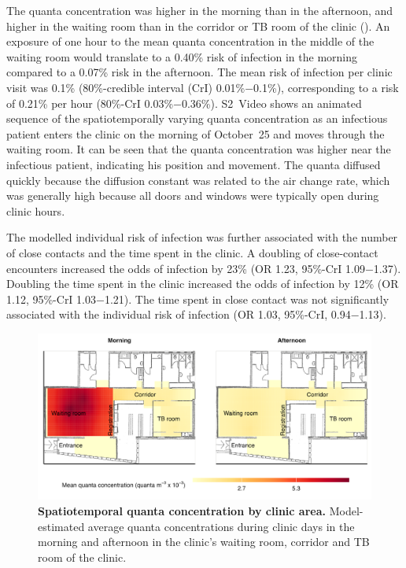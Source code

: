 \documentclass[fleqn,11pt]{wlscirep}
\begin{document}
The quanta concentration was higher in the morning than in the afternoon, and higher in the waiting room than in the corridor or TB room of the clinic (). An exposure of one hour to the mean quanta concentration in the middle of the waiting room would translate to a 0.40\% risk of infection in the morning compared to a 0.07\% risk in the afternoon. The mean risk of infection per clinic visit was 0.1\% (80\%-credible interval (CrI) 0.01\%$-$0.1\%), corresponding to a risk of 0.21\% per hour (80\%-CrI 0.03\%$-$0.36\%). S2~Video shows an animated sequence of the spatiotemporally varying quanta concentration as an infectious patient enters the clinic on the morning of October~25 and moves through the waiting room. It can be seen that the quanta concentration was higher near the infectious patient, indicating his position and movement. The quanta diffused quickly because the diffusion constant was related to the air change rate, which was generally high because all doors and windows were typically open during clinic hours.

The modelled individual risk of infection was further associated with the number of close contacts and the time spent in the clinic. A doubling of close-contact encounters increased the odds of infection by 23\% (OR 1.23, 95\%-CrI 1.09$-$1.37). Doubling the time spent in the clinic increased the odds of infection by 12\% (OR 1.12, 95\%-CrI 1.03$-$1.21). The time spent in close contact was not significantly associated with the individual risk of infection (OR 1.03, 95\%-CrI, 0.94$-$1.13). 

\begin{figure}
    \centering
    \includegraphics{results/modeling/mean-quanta-concentration.png}
    \caption{\textbf{Spatiotemporal quanta concentration by clinic area.} Model-estimated average quanta concentrations during clinic days in the morning and afternoon in the clinic's waiting room, corridor and TB room of the clinic.}
    \label{fig:main-modeling-results}
\end{figure}
\end{document}
